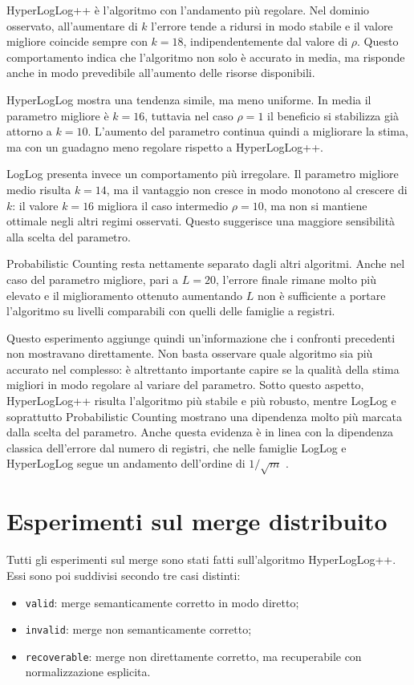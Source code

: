   HyperLogLog++ \`e l'algoritmo con l'andamento pi\`u regolare. Nel dominio
  osservato, all'aumentare di \(k\) l'errore tende a ridursi in modo stabile e il
  valore migliore coincide sempre con \(k=18\), indipendentemente dal valore di
  \(\rho\). Questo comportamento indica che l'algoritmo non solo \`e accurato in
  media, ma risponde anche in modo prevedibile all'aumento delle risorse
  disponibili.

  HyperLogLog mostra una tendenza simile, ma meno uniforme. In media il parametro
  migliore \`e \(k=16\), tuttavia nel caso \(\rho=1\) il beneficio si stabilizza
  gi\`a attorno a \(k=10\). L'aumento del parametro continua quindi a migliorare
  la stima, ma con un guadagno meno regolare rispetto a HyperLogLog++.

  LogLog presenta invece un comportamento pi\`u irregolare. Il parametro migliore
  medio risulta \(k=14\), ma il vantaggio non cresce in modo monotono al crescere
  di \(k\): il valore \(k=16\) migliora il caso intermedio \(\rho=10\), ma non si
  mantiene ottimale negli altri regimi osservati. Questo suggerisce una maggiore
  sensibilit\`a alla scelta del parametro.

  Probabilistic Counting resta nettamente separato dagli altri algoritmi. Anche
  nel caso del parametro migliore, pari a \(L=20\), l'errore finale rimane molto
  pi\`u elevato e il miglioramento ottenuto aumentando \(L\) non \`e sufficiente a
  portare l'algoritmo su livelli comparabili con quelli delle famiglie a
  registri.

Questo esperimento aggiunge quindi un'informazione che i confronti precedenti
non mostravano direttamente. Non basta osservare quale algoritmo sia pi\`u
accurato nel complesso: \`e altrettanto importante capire se la qualit\`a della
stima migliori in modo regolare al variare del parametro. Sotto questo aspetto,
HyperLogLog++ risulta l'algoritmo pi\`u stabile e pi\`u robusto, mentre LogLog e
soprattutto Probabilistic Counting mostrano una dipendenza molto pi\`u marcata
dalla scelta del parametro. Anche questa evidenza è in linea con la dipendenza
classica dell'errore dal numero di registri, che nelle famiglie LogLog e
HyperLogLog segue un andamento dell'ordine di \(1/\sqrt{m}\)
\cite{Durand_Flajolet_2003,Flajolet_Fusy_Gandouet_Meunier_2007}.

\section{Esperimenti sul merge distribuito}
Tutti gli esperimenti sul merge sono stati fatti sull'algoritmo HyperLogLog++. 
Essi sono poi suddivisi secondo tre casi distinti:
\begin{itemize}
    \item \texttt{valid}: merge semanticamente corretto in modo diretto;
    \item \texttt{invalid}: merge non semanticamente corretto;
    \item \texttt{recoverable}: merge non direttamente corretto, ma
    recuperabile con normalizzazione esplicita.
\end{itemize}

